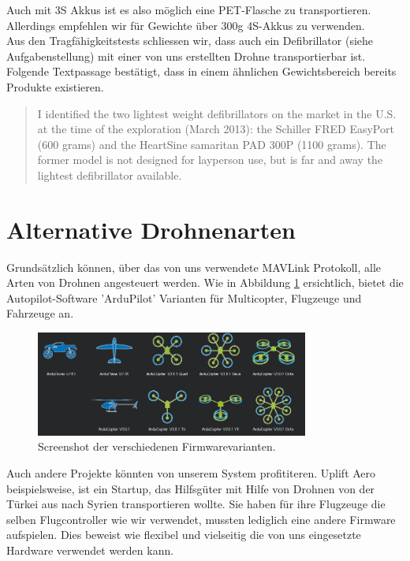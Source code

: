 Auch mit 3S Akkus ist es also möglich eine PET-Flasche zu transportieren. Allerdings empfehlen wir für Gewichte über 300g 4S-Akkus zu verwenden.\\

Aus den Tragfähigkeitstests schliessen wir, dass auch ein Defibrillator (siehe Aufgabenstellung) mit einer von uns erstellten Drohne transportierbar ist. Folgende Textpassage \cite[S3]{FleckUAV} bestätigt, dass in einem ähnlichen Gewichtsbereich bereits Produkte existieren.

\blockquote{I identified the two lightest weight defibrillators on the market in the U.S. at the time of the exploration (March 2013): the Schiller FRED EasyPort (600 grams) and the HeartSine samaritan PAD 300P (1100 grams). The former model is not designed for layperson use, but is far and away the lightest defibrillator available.}

\newpage

\section{Alternative Drohnenarten}
\label{sec:drone-alternatives}

Grundsätzlich können, über das von uns verwendete \Gls{MAVLink} Protokoll, alle Arten von Drohnen angesteuert werden. Wie in Abbildung \ref{fig:arduScreenshot} ersichtlich, bietet die Autopilot-Software 'ArduPilot' Varianten für Multicopter, Flugzeuge und Fahrzeuge an.\\
\begin{figure}[H]
\centering
\includegraphics[width=0.8\textwidth] {images/arduScreenshot.jpg}
\caption{Screenshot der verschiedenen Firmwarevarianten.}
\label{fig:arduScreenshot}
\end{figure}

Auch andere Projekte könnten von unserem System profititeren. Uplift Aero beispielsweise, ist ein Startup, das Hilfsgüter mit Hilfe von Drohnen von der Türkei aus nach Syrien transportieren wollte. Sie haben für ihre Flugzeuge die selben Flugcontroller wie wir verwendet, mussten lediglich eine andere Firmware aufspielen. Dies beweist wie flexibel und vielseitig die von uns eingesetzte Hardware verwendet werden kann.






